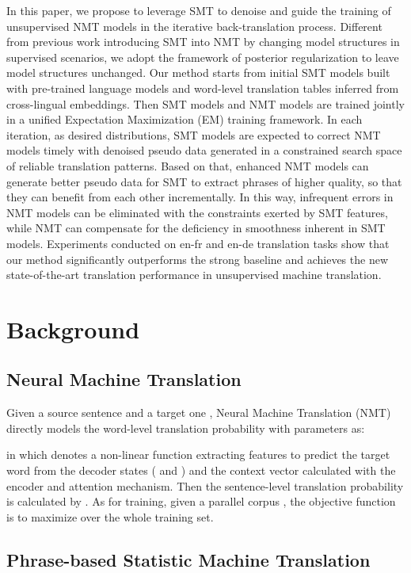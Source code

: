 \documentclass[letterpaper]{article} \usepackage{aaai19}  \usepackage{times}  \usepackage{helvet}  \usepackage{courier}  \usepackage{url}  \usepackage{graphicx}  \usepackage{amsmath}
\begin{document}
In this paper, we propose to leverage SMT to denoise and guide the training of unsupervised NMT models in the iterative back-translation process. Different from previous work \cite{he2016improved,tang2016neural,wang2017neural} introducing SMT into NMT by changing model structures in supervised scenarios, we adopt the framework of posterior regularization \cite{ganchev2010posterior} to leave model structures unchanged. 
Our method starts from initial SMT models built with pre-trained language models and word-level translation tables inferred from cross-lingual embeddings. Then SMT models and NMT models are trained jointly in a unified Expectation Maximization (EM) training framework. 
In each iteration, as desired distributions, SMT models are expected to correct NMT models timely with denoised pseudo data generated in a constrained search space of reliable translation patterns. Based on that, enhanced NMT models can generate better pseudo data for SMT to extract phrases of higher quality, so that they can benefit from each other incrementally.
In this way, infrequent errors in NMT models can be eliminated with the constraints exerted by SMT features, while NMT can compensate for the deficiency in smoothness inherent in SMT models.
Experiments conducted on en-fr and en-de translation tasks show that our method significantly outperforms the strong baseline \cite{lample2018phrase} and achieves the new state-of-the-art translation performance in unsupervised machine translation.

\section{Background}
\subsection{Neural Machine Translation}
Given a source sentence  and a target one , Neural Machine Translation (NMT) directly models the word-level translation probability with parameters  as:

in which  denotes a non-linear function extracting features to predict the target word  from the decoder states ( and )  
and the context vector  calculated with the encoder and attention mechanism. Then the sentence-level translation probability  is calculated by . As for training, given a parallel corpus , the objective function is to maximize  over the whole training set.

\subsection{Phrase-based Statistic Machine Translation}
\label{PBSMT}
\end{document}
